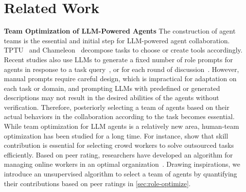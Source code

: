 \documentclass{article} %
\begin{document}
    

\section{Related Work}\label{sec:related-work}
\textbf{Team Optimization of LLM-Powered Agents}
The construction of agent teams is the essential and initial step for LLM-powered agent collaboration. TPTU~\citep{tptu} and Chameleon~\citep{lu2023chameleon} decompose tasks to choose or create tools accordingly. Recent studies also use LLMs to generate a fixed number of role prompts for agents in response to a task query~\citep{multi-persona, meta-prompting}, or for each round of discussion~\citep{chen2023agentverse}.
However, manual prompts require careful design, which is impractical for adaptation on each task or domain, and prompting LLMs with predefined or generated descriptions may not result in the desired abilities of the agents without verification. Therefore, posteriorly selecting a team of agents based on their actual behaviors in the collaboration according to the task becomes essential.
While team optimization for LLM agents is a relatively new area, human-team optimization has been studied for a long time. For instance, \citet{human-team-building} show that skill contribution is essential for selecting crowd workers to solve outsourced tasks efficiently. Based on peer rating, researchers have developed an algorithm for managing online workers in an optimal organization~\citep{human-team-optimization}. 
Drawing inspirations, we introduce an unsupervised algorithm to select a team of agents by quantifying their contributions based on peer ratings in \cref{sec:role-optimize}.
\end{document}
